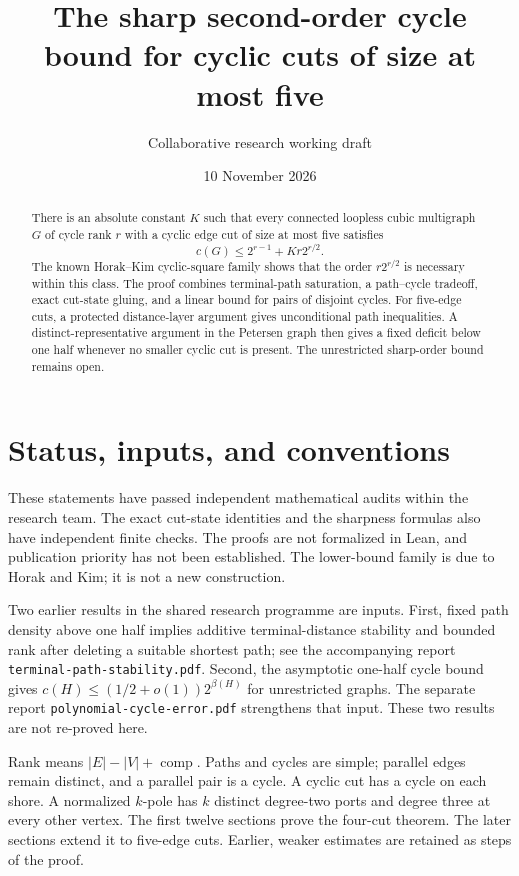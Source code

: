 \documentclass[11pt]{article}
\title{The sharp second-order cycle bound for cyclic cuts of size at most five}
\author{Collaborative research working draft}
\date{10 November 2026}
\begin{document}
\maketitle
\begin{abstract}
There is an absolute constant $K$ such that every connected loopless cubic multigraph $G$ of cycle rank $r$ with a cyclic edge cut of size at most five satisfies
\[
 c(G)\le 2^{r-1}+Kr2^{r/2}.
\]
The known Horak--Kim cyclic-square family shows that the order $r2^{r/2}$ is necessary within this class.
The proof combines terminal-path saturation, a path--cycle tradeoff, exact cut-state gluing, and a linear bound for pairs of disjoint cycles.
For five-edge cuts, a protected distance-layer argument gives unconditional path inequalities.
A distinct-representative argument in the Petersen graph then gives a fixed deficit below one half whenever no smaller cyclic cut is present.
The unrestricted sharp-order bound remains open.
\end{abstract}

\section*{Status, inputs, and conventions}
These statements have passed independent mathematical audits within the research team.
The exact cut-state identities and the sharpness formulas also have independent finite checks.
The proofs are not formalized in Lean, and publication priority has not been established.
The lower-bound family is due to Horak and Kim; it is not a new construction.

Two earlier results in the shared research programme are inputs.
First, fixed path density above one half implies additive terminal-distance stability and bounded rank after deleting a suitable shortest path; see the accompanying report \nolinkurl{terminal-path-stability.pdf}.
Second, the asymptotic one-half cycle bound gives $c(H)\le(1/2+o(1))2^{\beta(H)}$ for unrestricted graphs.
The separate report \nolinkurl{polynomial-cycle-error.pdf} strengthens that input.
These two results are not re-proved here.

Rank means $|E|-|V|+\operatorname{comp}$.
Paths and cycles are simple; parallel edges remain distinct, and a parallel pair is a cycle.
A cyclic cut has a cycle on each shore.
A normalized $k$-pole has $k$ distinct degree-two ports and degree three at every other vertex.
The first twelve sections prove the four-cut theorem.
The later sections extend it to five-edge cuts.
Earlier, weaker estimates are retained as steps of the proof.
\end{document}
